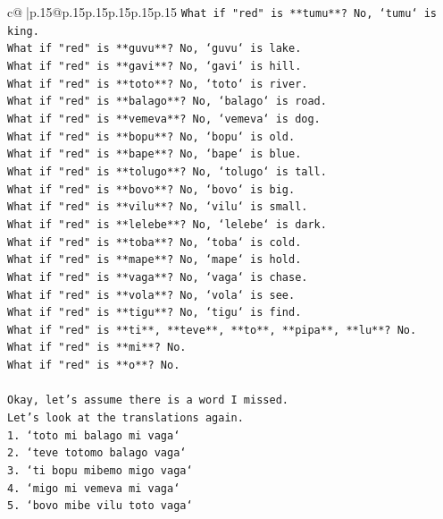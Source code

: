 \documentclass{article}
\begin{document}
{\begin{supertabular}{c@{$\;$}|p{.15\linewidth}@{}p{.15\linewidth}p{.15\linewidth}p{.15\linewidth}p{.15\linewidth}p{.15\linewidth}}
{{{\texttt{What if "red" is **tumu**? No, `tumu` is king.} \\
\texttt{What if "red" is **guvu**? No, `guvu` is lake.} \\
\texttt{What if "red" is **gavi**? No, `gavi` is hill.} \\
\texttt{What if "red" is **toto**? No, `toto` is river.} \\
\texttt{What if "red" is **balago**? No, `balago` is road.} \\
\texttt{What if "red" is **vemeva**? No, `vemeva` is dog.} \\
\texttt{What if "red" is **bopu**? No, `bopu` is old.} \\
\texttt{What if "red" is **bape**? No, `bape` is blue.} \\
\texttt{What if "red" is **tolugo**? No, `tolugo` is tall.} \\
\texttt{What if "red" is **bovo**? No, `bovo` is big.} \\
\texttt{What if "red" is **vilu**? No, `vilu` is small.} \\
\texttt{What if "red" is **lelebe**? No, `lelebe` is dark.} \\
\texttt{What if "red" is **toba**? No, `toba` is cold.} \\
\texttt{What if "red" is **mape**? No, `mape` is hold.} \\
\texttt{What if "red" is **vaga**? No, `vaga` is chase.} \\
\texttt{What if "red" is **vola**? No, `vola` is see.} \\
\texttt{What if "red" is **tigu**? No, `tigu` is find.} \\
\texttt{What if "red" is **ti**, **teve**, **to**, **pipa**, **lu**? No.} \\
\texttt{What if "red" is **mi**? No.} \\
\texttt{What if "red" is **o**? No.} \\
\\ 
\texttt{Okay, let's assume there is a word I missed.} \\
\texttt{Let's look at the translations again.} \\
\texttt{1. `toto mi balago mi vaga`} \\
\texttt{2. `teve totomo balago vaga`} \\
\texttt{3. `ti bopu mibemo migo vaga`} \\
\texttt{4. `migo mi vemeva mi vaga`} \\
\texttt{5. `bovo mibe vilu toto vaga`} \\
}}}
\end{supertabular}}
\end{document}
